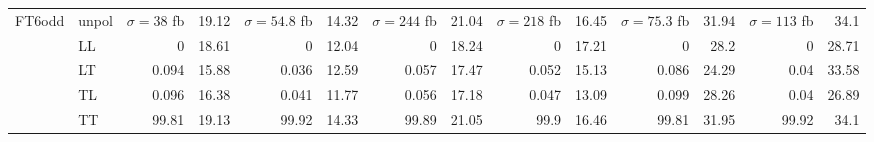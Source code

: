 \begin{table}[H]
{\begin{tabular}{llrrrrrrrrrrrr}
\midrule
\multirow{5}{*}{FT6odd}
 & unpol & $\sigma = \num{38}$ fb & \num{19.12} & $\sigma = \num{54.8}$ fb & \num{14.32} & $\sigma = \num{244}$ fb & \num{21.04} & $\sigma = \num{218}$ fb & \num{16.45} & $\sigma = \num{75.3}$ fb & \num{31.94} & $\sigma = \num{113}$ fb & \num{34.1} \\
 & LL & \num{0} & \num{18.61} & \num{0} & \num{12.04} & \num{0} & \num{18.24} & \num{0} & \num{17.21} & \num{0} & \num{28.2} & \num{0} & \num{28.71} \\
 & LT & \num{0.094} & \num{15.88} & \num{0.036} & \num{12.59} & \num{0.057} & \num{17.47} & \num{0.052} & \num{15.13} & \num{0.086} & \num{24.29} & \num{0.04} & \num{33.58} \\
 & TL & \num{0.096} & \num{16.38} & \num{0.041} & \num{11.77} & \num{0.056} & \num{17.18} & \num{0.047} & \num{13.09} & \num{0.099} & \num{28.26} & \num{0.04} & \num{26.89} \\
 & TT & \num{99.81} & \num{19.13} & \num{99.92} & \num{14.33} & \num{99.89} & \num{21.05} & \num{99.9} & \num{16.46} & \num{99.81} & \num{31.95} & \num{99.92} & \num{34.1} \\
\bottomrule
\end{tabular}
}%
\end{table}